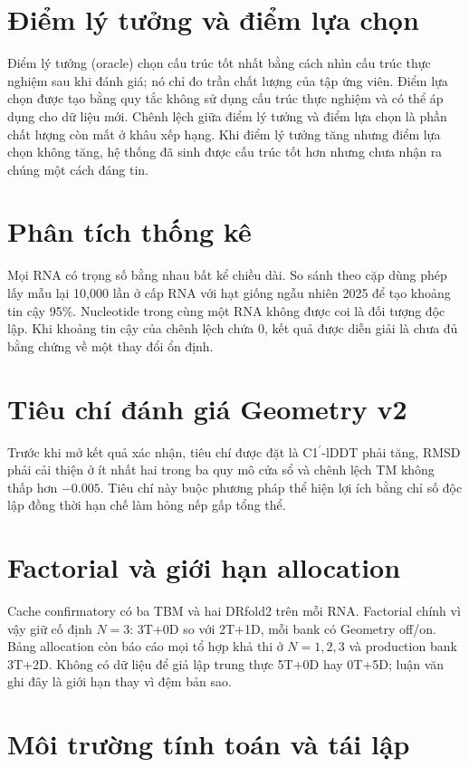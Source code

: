 \documentclass[12pt,a4paper,oneside]{report}
\newcommand{\cprime}{C1$^{\prime}$}
\begin{document}
\section{Điểm lý tưởng và điểm lựa chọn}

Điểm lý tưởng (oracle) chọn cấu trúc tốt nhất bằng cách nhìn cấu trúc thực nghiệm sau
khi đánh giá; nó chỉ đo trần chất lượng của tập ứng viên. Điểm lựa chọn được tạo bằng quy tắc không sử
dụng cấu trúc thực nghiệm và có thể áp dụng cho dữ liệu mới. Chênh lệch giữa điểm lý
tưởng và điểm lựa chọn là phần chất lượng còn mất ở khâu xếp hạng. Khi điểm lý tưởng
tăng nhưng điểm lựa chọn không tăng, hệ thống đã sinh được cấu trúc tốt hơn nhưng chưa
nhận ra chúng một cách đáng tin.

\section{Phân tích thống kê}

Mọi RNA có trọng số bằng nhau bất kể chiều dài. So sánh theo cặp dùng phép lấy mẫu lại
10,000 lần ở cấp RNA với hạt giống ngẫu nhiên 2025 để tạo khoảng tin cậy 95\%.
Nucleotide trong cùng một RNA
không được coi là đối tượng độc lập. Khi khoảng tin cậy của chênh lệch chứa 0, kết quả
được diễn giải là chưa đủ bằng chứng về một thay đổi ổn định.

\section{Tiêu chí đánh giá Geometry v2}

Trước khi mở kết quả xác nhận, tiêu chí được đặt là \cprime{}-lDDT phải tăng, RMSD phải
cải thiện ở ít nhất hai trong ba quy mô cửa sổ và chênh lệch TM không thấp hơn $-0.005$.
Tiêu chí này buộc phương pháp thể hiện lợi ích bằng chỉ số độc lập đồng thời hạn chế làm
hỏng nếp gấp tổng thể.

\section{Factorial và giới hạn allocation}

Cache confirmatory có ba TBM và hai DRfold2 trên mỗi RNA. Factorial chính vì vậy giữ
cố định $N=3$: 3T+0D so với 2T+1D, mỗi bank có Geometry off/on. Bảng allocation còn
báo cáo mọi tổ hợp khả thi ở $N=1,2,3$ và production bank 3T+2D. Không có dữ liệu để
giả lập trung thực 5T+0D hay 0T+5D; luận văn ghi đây là giới hạn thay vì đệm bản sao.

\section{Môi trường tính toán và tái lập}
\end{document}
